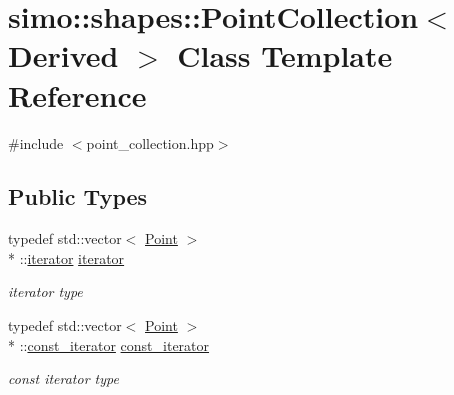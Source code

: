 \hypertarget{classsimo_1_1shapes_1_1_point_collection}{\section{simo\-:\-:shapes\-:\-:Point\-Collection$<$ Derived $>$ Class Template Reference}
\label{classsimo_1_1shapes_1_1_point_collection}
}


{\ttfamily \#include $<$point\-\_\-collection.\-hpp$>$}

\subsection*{Public Types}
\begin{DoxyCompactItemize}
\item 
\hypertarget{classsimo_1_1shapes_1_1_point_collection_a25dbe26192164dc3dbed17ecbbdb5b3d}{typedef std\-::vector$<$ \hyperlink{classsimo_1_1shapes_1_1_point}{Point} $>$\\*
\-::\hyperlink{classsimo_1_1shapes_1_1_point_collection_a25dbe26192164dc3dbed17ecbbdb5b3d}{iterator} \hyperlink{classsimo_1_1shapes_1_1_point_collection_a25dbe26192164dc3dbed17ecbbdb5b3d}{iterator}}\label{classsimo_1_1shapes_1_1_point_collection_a25dbe26192164dc3dbed17ecbbdb5b3d}

\begin{DoxyCompactList}\small\item\em iterator type \end{DoxyCompactList}\item 
\hypertarget{classsimo_1_1shapes_1_1_point_collection_a74bbad0a4b30238f8cebfe6eea4d7c1c}{typedef std\-::vector$<$ \hyperlink{classsimo_1_1shapes_1_1_point}{Point} $>$\\*
\-::\hyperlink{classsimo_1_1shapes_1_1_point_collection_a74bbad0a4b30238f8cebfe6eea4d7c1c}{const\-\_\-iterator} \hyperlink{classsimo_1_1shapes_1_1_point_collection_a74bbad0a4b30238f8cebfe6eea4d7c1c}{const\-\_\-iterator}}\label{classsimo_1_1shapes_1_1_point_collection_a74bbad0a4b30238f8cebfe6eea4d7c1c}

\begin{DoxyCompactList}\small\item\em const iterator type \end{DoxyCompactList}\end{DoxyCompactItemize}
